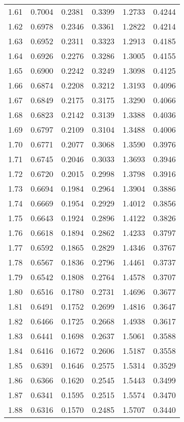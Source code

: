 \documentclass{article}
\begin{document}
\begin{longtable}{cccccc}
1.61 & 0.7004 & 0.2381 & 0.3399 & 1.2733 & 0.4244 \\
1.62 & 0.6978 & 0.2346 & 0.3361 & 1.2822 & 0.4214 \\
1.63 & 0.6952 & 0.2311 & 0.3323 & 1.2913 & 0.4185 \\
1.64 & 0.6926 & 0.2276 & 0.3286 & 1.3005 & 0.4155 \\
1.65 & 0.6900 & 0.2242 & 0.3249 & 1.3098 & 0.4125 \\
1.66 & 0.6874 & 0.2208 & 0.3212 & 1.3193 & 0.4096 \\
1.67 & 0.6849 & 0.2175 & 0.3175 & 1.3290 & 0.4066 \\
1.68 & 0.6823 & 0.2142 & 0.3139 & 1.3388 & 0.4036 \\
1.69 & 0.6797 & 0.2109 & 0.3104 & 1.3488 & 0.4006 \\
1.70 & 0.6771 & 0.2077 & 0.3068 & 1.3590 & 0.3976 \\
1.71 & 0.6745 & 0.2046 & 0.3033 & 1.3693 & 0.3946 \\
1.72 & 0.6720 & 0.2015 & 0.2998 & 1.3798 & 0.3916 \\
1.73 & 0.6694 & 0.1984 & 0.2964 & 1.3904 & 0.3886 \\
1.74 & 0.6669 & 0.1954 & 0.2929 & 1.4012 & 0.3856 \\
1.75 & 0.6643 & 0.1924 & 0.2896 & 1.4122 & 0.3826 \\
1.76 & 0.6618 & 0.1894 & 0.2862 & 1.4233 & 0.3797 \\
1.77 & 0.6592 & 0.1865 & 0.2829 & 1.4346 & 0.3767 \\
1.78 & 0.6567 & 0.1836 & 0.2796 & 1.4461 & 0.3737 \\
1.79 & 0.6542 & 0.1808 & 0.2764 & 1.4578 & 0.3707 \\
1.80 & 0.6516 & 0.1780 & 0.2731 & 1.4696 & 0.3677 \\
1.81 & 0.6491 & 0.1752 & 0.2699 & 1.4816 & 0.3647 \\
1.82 & 0.6466 & 0.1725 & 0.2668 & 1.4938 & 0.3617 \\
1.83 & 0.6441 & 0.1698 & 0.2637 & 1.5061 & 0.3588 \\
1.84 & 0.6416 & 0.1672 & 0.2606 & 1.5187 & 0.3558 \\
1.85 & 0.6391 & 0.1646 & 0.2575 & 1.5314 & 0.3529 \\
1.86 & 0.6366 & 0.1620 & 0.2545 & 1.5443 & 0.3499 \\
1.87 & 0.6341 & 0.1595 & 0.2515 & 1.5574 & 0.3470 \\
1.88 & 0.6316 & 0.1570 & 0.2485 & 1.5707 & 0.3440 \\

\end{longtable}
\end{document}
